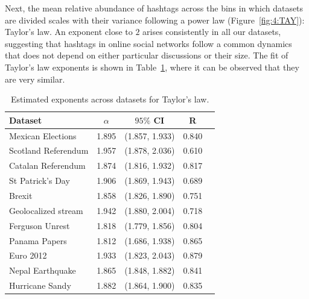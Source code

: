 
Next, the mean relative abundance of hashtags across the bins in which datasets are divided scales with their variance following a power law (Figure~\ref{fig:4:TAY}): Taylor's law. An exponent close to $2$ arises consistently in all our datasets, suggesting that hashtags in online social networks follow a common dynamics that does not depend on either particular discussions or their size. The fit of Taylor's law exponents is shown in Table~\ref{tab:chp4:taylor}, where it can be observed that they are very similar. \\



\begin{table}[h] 
\caption{Estimated exponents across datasets for Taylor's law.}
\centering
\begin{tabular}{l c c c c } 
\hline 
Dataset &  $\alpha$ & $95\%$ CI & R \\ \hline \hline 
Mexican Elections & 1.895 & (1.857, 1.933) & 0.840 \\ \hline 
Scotland Referendum & 1.957 & (1.878, 2.036) & 0.610 \\ \hline 
Catalan Referendum & 1.874 & (1.816, 1.932) & 0.817 \\ \hline 
St Patrick's Day & 1.906 & (1.869, 1.943) & 0.689 \\ \hline 
Brexit & 1.858 & (1.826, 1.890) & 0.751 \\ \hline 
Geolocalized stream & 1.942 & (1.880, 2.004) & 0.718 \\ \hline 
Ferguson Unrest & 1.818 & (1.779, 1.856) & 0.804 \\ \hline 
Panama Papers & 1.812 & (1.686, 1.938) & 0.865 \\ \hline 
Euro 2012 & 1.933 & (1.823, 2.043) & 0.879 \\ \hline 
Nepal Earthquake & 1.865 & (1.848, 1.882) & 0.841 \\ \hline 
Hurricane Sandy & 1.882 & (1.864, 1.900) & 0.835 \\ \hline 
\end{tabular} \label{tab:chp4:taylor}
\end{table} 



